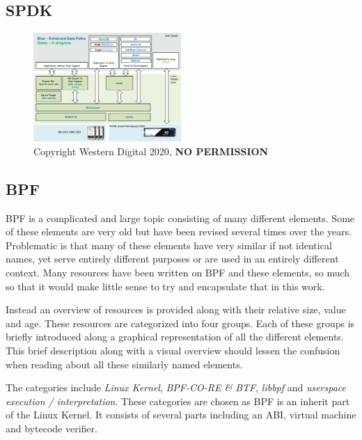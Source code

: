 \documentclass[conference]{IEEEtran}
\begin{document}
\subsection{SPDK}

\begin{center}
	\begin{figure}[H]
		\includegraphics[width=0.5\textwidth]{resources/images/spdk-zns-ssd-landscape.png}
		\captionsetup{justification=centering}
		\caption{Copyright Western Digital 2020, \textbf{NO PERMISSION}}
		\label{fig:spdk-landscape}
	\end{figure}
\end{center}

\subsection{BPF}

BPF is a complicated and large topic consisting of many different elements. Some
of these elements are very old but have been revised several times over the
years. Problematic is that many of these elements have very similar if not
identical names, yet serve entirely different purposes or are used in an
entirely different context. Many resources have been written on BPF and these
elements, so much so that it would make little sense to try and encapsulate that
in this work.

Instead an overview of resources is provided along with their relative size,
value and age. These resources are categorized into four groups. Each of these
groups is briefly introduced along a graphical representation of all the
different elements. This brief description along with a visual overview should
lessen the confusion when reading about all these similarly named elements.

The categories include \textit{Linux Kernel}, \textit{BPF-CO-RE \& BTF},
\textit{libbpf} and \textit{userspace execution / interpretation}. These
categories are chosen as BPF is an inherit part of the Linux Kernel. It consists
of several parts including an ABI, virtual machine and bytecode verifier.
\end{document}
